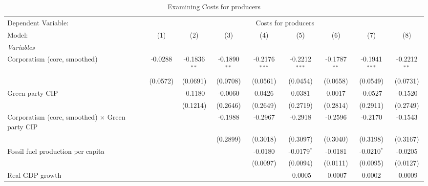 
\begin{table}[htbp]
   \caption{Examining Costs for producers}
   \centering
   \begin{tabular}{lcccccccc}
      \tabularnewline \midrule \midrule
      Dependent Variable: & \multicolumn{8}{c}{Costs for producers}\\
      Model:                                                 & (1)      & (2)            & (3)            & (4)             & (5)             & (6)            & (7)             & (8)\\  
      \midrule
      \emph{Variables}\\
      Corporatism (core, smoothed)                           & -0.0288  & -0.1836$^{**}$ & -0.1890$^{**}$ & -0.2176$^{***}$ & -0.2212$^{***}$ & -0.1787$^{**}$ & -0.1941$^{***}$ & -0.2212$^{**}$\\   
                                                             & (0.0572) & (0.0691)       & (0.0708)       & (0.0561)        & (0.0454)        & (0.0658)       & (0.0549)        & (0.0731)\\   
      Green party CIP                                        &          & -0.1180        & -0.0060        & 0.0426          & 0.0381          & 0.0017         & -0.0527         & -0.1520\\   
                                                             &          & (0.1214)       & (0.2646)       & (0.2649)        & (0.2719)        & (0.2814)       & (0.2911)        & (0.2749)\\   
      Corporatism (core, smoothed) $\times$ Green party CIP  &          &                & -0.1988        & -0.2967         & -0.2918         & -0.2596        & -0.2170         & -0.1543\\   
                                                             &          &                & (0.2899)       & (0.3018)        & (0.3097)        & (0.3040)       & (0.3198)        & (0.3167)\\   
      Fossil fuel production per capita                      &          &                &                & -0.0180         & -0.0179$^{*}$   & -0.0181        & -0.0210$^{*}$   & -0.0205\\   
                                                             &          &                &                & (0.0097)        & (0.0094)        & (0.0111)       & (0.0095)        & (0.0127)\\   
      Real GDP growth                                        &          &                &                &                 & -0.0005         & -0.0007        & 0.0002          & -0.0009\\   

\end{tabular}
\end{table}
